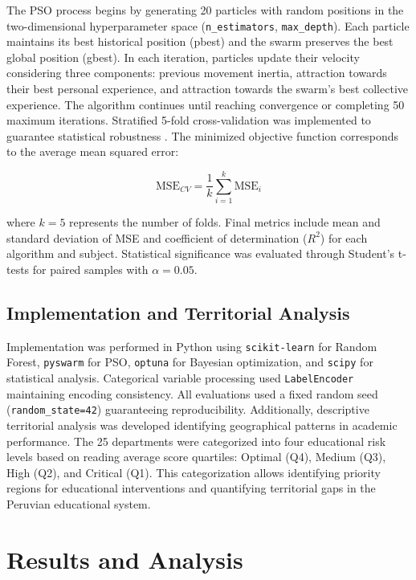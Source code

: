 \documentclass[conference]{IEEEtran}
\begin{document}
The PSO process begins by generating 20 particles with random positions in the two-dimensional hyperparameter space (\texttt{n\_estimators}, \texttt{max\_depth}). Each particle maintains its best historical position (pbest) and the swarm preserves the best global position (gbest). In each iteration, particles update their velocity considering three components: previous movement inertia, attraction towards their best personal experience, and attraction towards the swarm's best collective experience. The algorithm continues until reaching convergence or completing 50 maximum iterations. Stratified 5-fold cross-validation was implemented to guarantee statistical robustness \cite{kohavi1995study}. The minimized objective function corresponds to the average mean squared error:

\begin{equation}
\text{MSE}_{CV} = \frac{1}{k} \sum_{i=1}^{k} \text{MSE}_i
\end{equation}

where $k=5$ represents the number of folds. Final metrics include mean and standard deviation of MSE and coefficient of determination ($R^2$) for each algorithm and subject. Statistical significance was evaluated through Student's t-tests for paired samples \cite{dietterich1998approximate} with $\alpha = 0.05$.

\subsection{Implementation and Territorial Analysis}
Implementation was performed in Python using \texttt{scikit-learn} for Random Forest, \texttt{pyswarm} for PSO, \texttt{optuna} for Bayesian optimization, and \texttt{scipy} for statistical analysis. Categorical variable processing used \texttt{LabelEncoder} maintaining encoding consistency. All evaluations used a fixed random seed (\texttt{random\_state=42}) guaranteeing reproducibility. Additionally, descriptive territorial analysis was developed identifying geographical patterns in academic performance. The 25 departments were categorized into four educational risk levels based on reading average score quartiles: Optimal (Q4), Medium (Q3), High (Q2), and Critical (Q1). This categorization allows identifying priority regions for educational interventions and quantifying territorial gaps in the Peruvian educational system.

\section{Results and Analysis}
\end{document}
